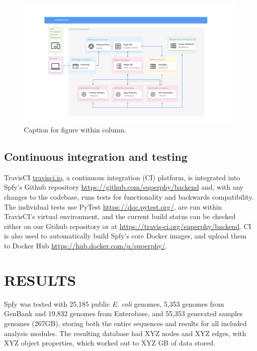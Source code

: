 \documentclass[a4,center,fleqn]{NAR}
\begin{document}
\begin{figure}[t]
\begin{center}
\includegraphics{images/docker.svg}
\end{center}
\caption{Caption for figure within column.}
\label{fig-docker}
\end{figure}

\subsection{Continuous integration and testing}

TravisCI \url{travisci.io}, a continuous integration (CI) platform, is integrated into Spfy's Github repository \url{https://github.com/superphy/backend} and, with any changes to the codebase, runs tests for functionality and backwards compatibility.
The individual tests use PyTest \url{https://doc.pytest.org/}, are run within TravisCI's virtual environment, and the current build status can be checked either on our Gtihub repository or at \url{https://travis-ci.org/superphy/backend}.
CI is also used to automatically build Spfy's core Docker images, and upload them to Docker Hub \url{https://hub.docker.com/u/superphy/}.

\section{RESULTS}

Spfy was tested with 25,185 public \textit{E. coli} genomes, 5,353 genomes from GenBank and 19,832 genomes from Enterobase, and 55,353 generated samples genomes (267GB), storing both the entire sequences and results for all included analysis modules.
The resulting database had XYZ nodes and XYZ edges, with XYZ object properties, which worked out to XYZ GB of data stored.
\end{document}
